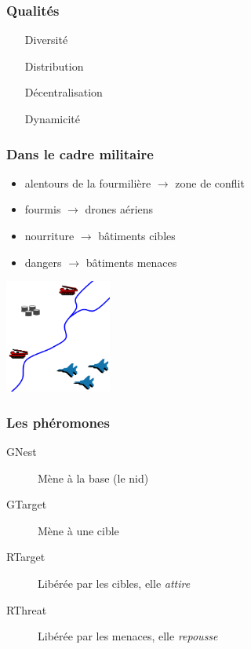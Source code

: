 \documentclass{beamer}
\begin{document}
\begin{frame}

  \frametitle{Qualités}

  \begin{itemize}
    \item[Diversité]{}
    \item[Distribution]{}
    \item[Décentralisation]{}
    \item[Dynamicité]{}
  \end{itemize}

\end{frame}

\begin{block}

  \frametitle{Dans le cadre militaire}

  \begin{itemize}
  \item{alentours de la fourmilière  $\rightarrow$ zone de conflit}
  \item{fourmis $\rightarrow$ drones aériens}
  \item{nourriture $\rightarrow$ bâtiments cibles}
  \item{dangers $\rightarrow$ bâtiments menaces}
  \end{itemize}

  \includegraphics[width=3.5cm]{terrain_real.png}

\end{block}

\begin{block}

  \frametitle{Les phéromones}

  \begin{description}
  \item[GNest]{Mène à la base (le nid)}
  \item[GTarget]{Mène à une cible}
  \item[RTarget]{Libérée par les cibles, elle \textit{attire}}
  \item[RThreat]{Libérée par les menaces, elle \textit{repousse}}
  \end{description}

\end{block}
\end{document}
